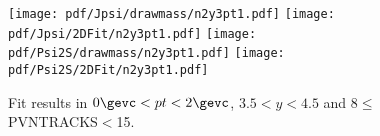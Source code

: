 \begin{figure}[H]
\begin{center}
\texttt{[image: pdf/Jpsi/drawmass/n2y3pt1.pdf]}
\texttt{[image: pdf/Jpsi/2DFit/n2y3pt1.pdf]}
\vspace*{-0.5cm}
\texttt{[image: pdf/Psi2S/drawmass/n2y3pt1.pdf]}
\texttt{[image: pdf/Psi2S/2DFit/n2y3pt1.pdf]}
\vspace*{-0.5cm}
\end{center}
\caption{Fit results in $0\gevc<pt<2\gevc$, $3.5<y<4.5$ and 8$\leq$PVNTRACKS$<$15.}
\label{Fitn2y3pt1}
\end{figure}
